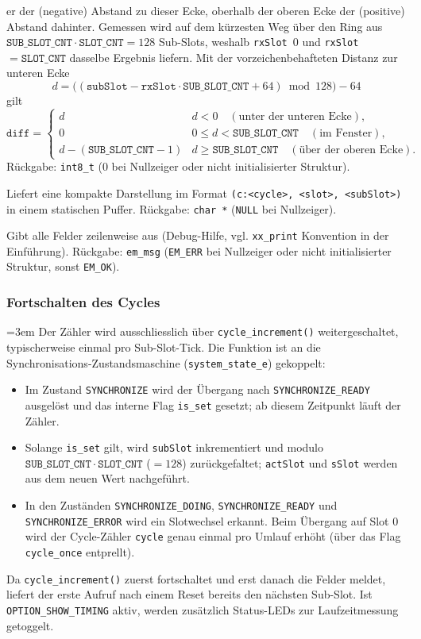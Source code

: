 \begin{description}
  er der (negative) Abstand zu dieser Ecke, oberhalb der oberen Ecke der
  (positive) Abstand dahinter. Gemessen wird auf dem kürzesten Weg über den
  Ring aus $\mathtt{SUB\_SLOT\_CNT} \cdot \mathtt{SLOT\_CNT} = 128$ Sub-Slots,
  weshalb \verb|rxSlot|~$0$ und \verb|rxSlot|~$=\mathtt{SLOT\_CNT}$ dasselbe
  Ergebnis liefern. Mit der vorzeichenbehafteten Distanz zur unteren Ecke
  \[
    d = \big((\mathtt{subSlot} - \mathtt{rxSlot} \cdot
    \mathtt{SUB\_SLOT\_CNT} + 64) \bmod 128\big) - 64
  \]
  gilt
  \[
    \mathtt{diff} =
    \begin{cases}
      d & d < 0 \quad(\text{unter der unteren Ecke}),\\
      0 & 0 \le d < \mathtt{SUB\_SLOT\_CNT} \quad(\text{im Fenster}),\\
      d - (\mathtt{SUB\_SLOT\_CNT}-1) & d \ge \mathtt{SUB\_SLOT\_CNT}
        \quad(\text{über der oberen Ecke}).
    \end{cases}
  \]
  Rückgabe: \verb|int8_t| ($0$ bei Nullzeiger oder nicht initialisierter
  Struktur).
\item[\texttt{cycle\_string(cycle)}] Liefert eine kompakte Darstellung im
  Format \verb|(c:<cycle>, <slot>, <subSlot>)| in einem statischen Puffer.
  Rückgabe: \verb|char *| (\verb|NULL| bei Nullzeiger).
\item[\texttt{cycle\_print(cycle, title)}] Gibt alle Felder zeilenweise aus
  (Debug-Hilfe, vgl. \verb|xx_print| Konvention in der Einführung). Rückgabe:
  \verb|em_msg| (\verb|EM_ERR| bei Nullzeiger oder nicht initialisierter
  Struktur, sonst \verb|EM_OK|).
\end{description}

\subsubsection*{Fortschalten des Cycles}
{\sloppy\emergencystretch=3em
Der Zähler wird ausschliesslich über \verb|cycle_increment()| weitergeschaltet,
typischerweise einmal pro Sub-Slot-Tick. Die Funktion ist an die
Synchronisations-Zustandsmaschine (\verb|system_state_e|) gekoppelt:

\begin{itemize}
\item Im Zustand \verb|SYNCHRONIZE| wird der Übergang nach
  \verb|SYNCHRONIZE_READY| ausgelöst und das interne Flag \verb|is_set|
  gesetzt; ab diesem Zeitpunkt läuft der Zähler.
\item Solange \verb|is_set| gilt, wird \verb|subSlot| inkrementiert und modulo
  $\mathtt{SUB\_SLOT\_CNT} \cdot \mathtt{SLOT\_CNT}$ ($=128$) zurückgefaltet;
  \verb|actSlot| und \verb|sSlot| werden aus dem neuen Wert nachgeführt.
\item In den Zuständen \verb|SYNCHRONIZE_DOING|, \verb|SYNCHRONIZE_READY| und
  \verb|SYNCHRONIZE_ERROR| wird ein Slotwechsel erkannt. Beim Übergang auf
  Slot $0$ wird der Cycle-Zähler \verb|cycle| genau einmal pro Umlauf erhöht
  (über das Flag \verb|cycle_once| entprellt).
\end{itemize}
\par}

\noindent Da \verb|cycle_increment()| zuerst fortschaltet und erst danach die
Felder meldet, liefert der erste Aufruf nach einem Reset bereits den nächsten
Sub-Slot. Ist \verb|OPTION_SHOW_TIMING| aktiv, werden zusätzlich Status-LEDs
zur Laufzeitmessung getoggelt.
